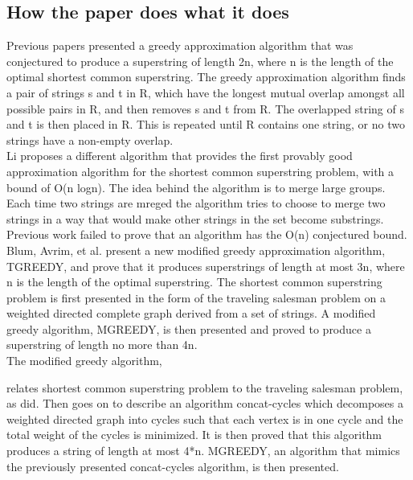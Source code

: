 \documentclass[letterpaper,twocolumn,11pt,titlepage]{article}
\begin{document}
\subsection*{How the paper does what it does}
Previous papers \cite{tarhio1988greedy} \cite{turner1989approximation} presented a greedy approximation algorithm that was conjectured to produce a superstring of length 2n, where n is the length of the optimal shortest common superstring.  The greedy approximation algorithm finds a pair of strings s and t in R, which have the longest mutual overlap amongst all possible pairs in R, and then removes s and t from R.  The overlapped string of s and t is then placed in R.  This is repeated until R contains one string, or no two strings have a non-empty overlap. \cite{tarhio1988greedy} \\

Li \cite{li1990towards} proposes a different algorithm that provides the first provably good approximation algorithm for the shortest common superstring problem, with a bound of O(n logn).  The idea behind the algorithm is to merge large groups.  Each time two strings are mreged the algorithm tries to choose to merge two strings in a way that would make other strings in the set become substrings.  \\

Previous work failed to prove that an algorithm has the O(n) conjectured bound.  Blum, Avrim, et al. \cite{blum1991linear} present a new modified greedy approximation algorithm, TGREEDY, and prove that it produces superstrings of length at most 3n, where n is the length of the optimal superstring.  The shortest common superstring problem is first presented in the form of the traveling salesman problem on a weighted directed complete graph derived from a set of strings.  A modified greedy algorithm, MGREEDY, is then presented and proved to produce a superstring of length no more than 4n. \\
The modified greedy algorithm, 

\cite{blum1991linear} relates shortest common superstring problem to the traveling salesman problem, as \cite{turner1989approximation} did.  Then \cite{blum1991linear} goes on to describe an algorithm concat-cycles which decomposes a weighted directed graph into cycles such that each vertex is in one cycle and the total weight of the cycles is minimized.  It is then proved that this algorithm produces a string of length at most 4*n.  MGREEDY, an algorithm that mimics the previously presented concat-cycles algorithm, is then presented.
\end{document}
